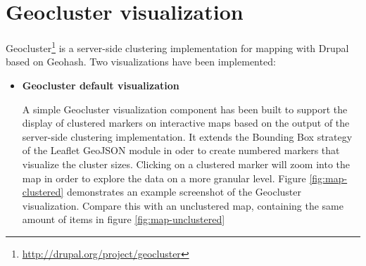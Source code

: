 \section{Geocluster visualization}

Geocluster\footnote{\url{http://drupal.org/project/geocluster}} is a server-side clustering implementation for mapping with Drupal based on Geohash. Two visualizations have been implemented:

\begin{itemize}

\item \textbf{Geocluster default visualization}

A simple Geocluster visualization component has been built to support the display of clustered markers on interactive maps based on the output of the server-side clustering implementation. It extends the Bounding Box strategy of the Leaflet GeoJSON module in oder to create numbered markers that visualize the cluster sizes. Clicking on a clustered marker will zoom into the map in order to explore the data on a more granular level. Figure \ref{fig:map-clustered} demonstrates an example screenshot of the Geocluster visualization. Compare this with an unclustered map, containing the same amount of items in figure \ref{fig:map-unclustered}



\end{itemize}
